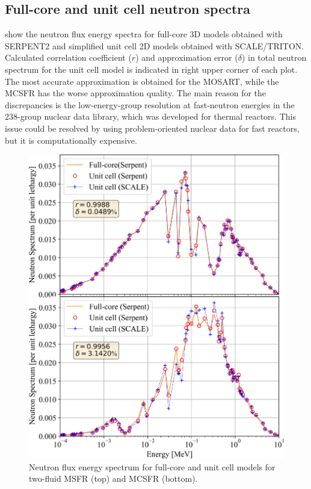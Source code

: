 \documentclass[letterpaper]{mandc2019}
\begin{document}
\subsection{Full-core and unit cell neutron spectra}
\label{sec:spectrum}
 show the neutron flux energy spectra for full-core 3D models obtained with SERPENT2 and simplified unit cell 2D models obtained with SCALE/TRITON. Calculated correlation coefficient ($r$) and approximation error ($\delta$) in total neutron spectrum for the unit cell model is indicated in right upper corner of each plot. The most accurate approximation is obtained for the \gls{MOSART}, while the \gls{MCSFR} has the worse approximation quality. The main reason for the discrepancies is the low-energy-group resolution at fast-neutron energies in the 238-group nuclear data library, which was developed for thermal reactors. This issue could be resolved by using problem-oriented nuclear data for fast reactors, but it is computationally expensive.
\begin{figure}[!htb]
  \centering
  \includegraphics[scale=0.545]{./Figures/two_full_vs_unit_spectrum.png}
      \vspace{-0.2in}
  \caption{Neutron flux energy spectrum for full-core and unit cell models for two-fluid \gls{MSFR} (top) and \gls{MCSFR} (bottom).}
  \label{fig:spectrum_two}
\end{figure}
\end{document}
